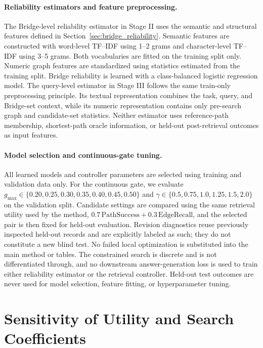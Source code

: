\documentclass{article} %
\begin{document}
\paragraph{Reliability estimators and feature preprocessing.}
The Bridge-level reliability estimator in Stage II uses the semantic and structural
features defined in Section~\ref{sec:bridge_reliability}. Semantic features are
constructed with word-level TF--IDF using 1--2 grams and character-level
TF--IDF using 3--5 grams. Both vocabularies are fitted on the training split only.
Numeric graph features are standardized using statistics estimated from the
training split. Bridge reliability is learned with a class-balanced logistic
regression model. The query-level estimator in Stage III follows the same
train-only preprocessing principle. Its textual representation combines the task,
query, and Bridge-set context, while its numeric representation contains only
pre-search graph and candidate-set statistics. Neither estimator uses
reference-path membership, shortest-path oracle information, or held-out
post-retrieval outcomes as input features.

\paragraph{Model selection and continuous-gate tuning.}
All learned models and controller parameters are selected using training and
validation data only. For the continuous gate, we evaluate
$g_{\max}\in\{0.20,0.25,0.30,0.35,0.40,0.45,0.50\}$ and
$\gamma\in\{0.5,0.75,1.0,1.25,1.5,2.0\}$ on the validation split. Candidate
settings are compared using the same retrieval utility used by the method,
$0.7\,\mathrm{PathSuccess}+0.3\,\mathrm{EdgeRecall}$, and the selected pair is
then fixed for held-out evaluation. Revision diagnostics reuse previously inspected held-out records and are explicitly labeled as such; they do not constitute a new blind test. No failed local optimization is substituted into the main method or tables. The constrained search is discrete and is
not differentiated through, and no downstream answer-generation loss is used
to train either reliability estimator or the retrieval controller. Held-out test
outcomes are never used for model selection, feature fitting, or hyperparameter
tuning.

\section{Sensitivity of Utility and Search Coefficients}
\label{app:search_parameter_sensitivity}
\end{document}
